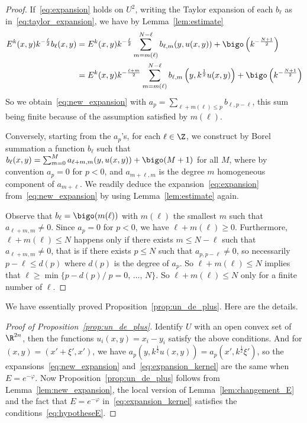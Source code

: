 \begin{proof}
If~\eqref{eq:expansion} holds on $U^2$, writing the Taylor
expansion of each $b_{\ell}$ as in~\eqref{eq:taylor_expansion}, we have by Lemma~\ref{lem:estimate}
\begin{align*}
E^k (x,y) k^{-\frac{\ell}{2}} b_{\ell} (x,y) &= E^k (x,y) k^{-
\frac{\ell}{2}} \sum_{m = m (\ell) }^{N- \ell } b_{\ell,m} (y, u(x,y)) +
\bigo\left(k^{-\frac{N+1}{2}}\right)\\
&=E^k (x,y) k^{-\frac{\ell +m }{2}} \sum_{m = m (\ell) }^{N- \ell } b_{\ell,m} \left(y,k^{\frac{1}{2}} u(x,y)\right) +
\bigo\left(k^{-\frac{N+1}{2}}\right)
\end{align*}
So we obtain~\eqref{eq:new_expansion} with $ a_p = \sum _{\ell + m (\ell)
\leqslant p } b_{\ell, p - \ell} $, this sum being finite because of the assumption satisfied by $m(\ell) $.

Conversely, starting from the $a_{p}$'s, for each $\ell \in \Z$, we construct by Borel summation a function $b_{\ell}$ such that $ b_{\ell} (x, y)=
\sum _{m =0 }^{M} a _{ \ell+m, m}(y,u (x,y)) + \bigo (M+1)$ for all $M$, where by convention $a_{p}=0$ for $p<0$, and $a_{m+\ell, m}$ is the degree $m$ homogeneous component of $a_{m+\ell}$. We readily deduce the expansion~\eqref{eq:expansion} from~\eqref{eq:new_expansion} by using Lemma~\ref{lem:estimate} again.

Observe that $b_{\ell} =
\bigo(m(\ell))$ with $m(\ell)$ the smallest $m$ such that $a_{\ell + m, m } \neq 0$. Since $a_{p} = 0$ for $p<0$, we have $\ell + m(\ell)
\geqslant 0$. Furthermore, $\ell + m (\ell) \leqslant N$ happens only if there exists $m \leqslant N - \ell$ such that $a_{\ell + m, m } \neq 0$, that is if there exists $p \leqslant N$ such that $ a _{p, p-\ell } \neq 0$, so necessarily $ p - \ell \leqslant d (p)$ where $d(p)$ is the degree of $a_p$. So $\ell + m (\ell) \leqslant N$ implies that $\ell \geqslant \min \{ p - d(p) / \; p =0,\,\ldots,\, N \}$. So $\ell + m (\ell) \leqslant N$ only for a finite number of $\ell$.
\end{proof}
 We have essentially proved Proposition~\ref{prop:un_de_plus}. Here are the details.

\begin{proof}[Proof of Proposition~\ref{prop:un_de_plus}]
Identify $U$ with an open convex set of $\R^{2n}$, then the functions $u_i(x,y)= x_i -y_i$ satisfy the above conditions. And for $(x,y) = (x' + \xi', x')$, we have $a_p (y, k^{\frac{1}{2}} u(x,y)) = a_p (x', k^{\frac{1}{2}} \xi')$, so the expansions~\eqref{eq:new_expansion} and~\eqref{eq:expansion_kernel} are the same when $E=e^{-\varphi}$. Now Proposition~\ref{prop:un_de_plus} follows from Lemma~\ref{lem:new_expansion}, the local version of Lemma~\ref{lem:changement_E} and the fact that $E=e^{-\varphi}$ in~\eqref{eq:expansion_kernel} satisfies the conditions~\eqref{eq:hypotheseE}.
\end{proof}

